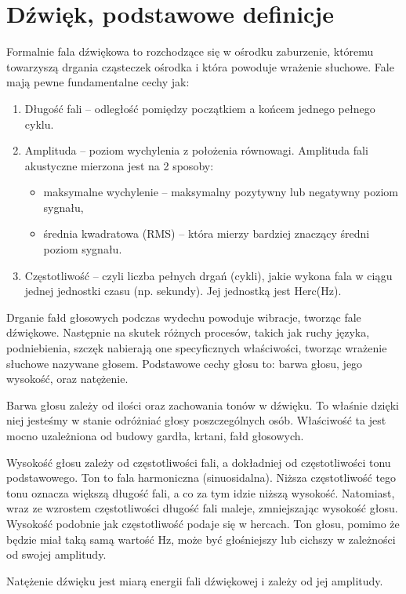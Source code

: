 \documentclass[declaration,shortabstract]{iithesis}
\begin{document}
\section{Dźwięk, podstawowe definicje}
Formalnie fala dźwiękowa to rozchodzące się w ośrodku zaburzenie, któremu towarzyszą drgania cząsteczek ośrodka i która powoduje wrażenie słuchowe. Fale mają pewne fundamentalne cechy jak:
\begin{enumerate}
\item Długość fali -- odległość pomiędzy początkiem a końcem jednego pełnego cyklu.
\item Amplituda -- poziom wychylenia z położenia równowagi. Amplituda fali akustyczne mierzona jest na 2 sposoby:
	\begin{itemize}
	\item maksymalne wychylenie -- maksymalny pozytywny lub negatywny poziom sygnału,
	\item średnia kwadratowa (RMS) -- która mierzy bardziej znaczący średni poziom sygnału.
	\end{itemize}
\item Częstotliwość -- czyli liczba pełnych drgań (cykli), jakie wykona fala w ciągu jednej jednostki czasu (np. sekundy). Jej jednostką jest Herc(Hz).
\end{enumerate}

Drganie fałd głosowych podczas wydechu powoduje wibracje, tworząc fale dźwiękowe. Następnie na skutek różnych procesów, takich jak ruchy języka, podniebienia, szczęk nabierają one specyficznych właściwości, tworząc wrażenie słuchowe nazywane głosem. Podstawowe cechy głosu to: barwa głosu, jego wysokość, oraz natężenie.

Barwa głosu zależy od ilości oraz zachowania tonów w dźwięku. To właśnie dzięki niej jesteśmy w stanie odróżniać głosy poszczególnych osób. Właściwość ta jest mocno uzależniona od budowy gardła, krtani, fałd głosowych. 

Wysokość głosu zależy od częstotliwości fali, a dokładniej od częstotliwości tonu podstawowego. Ton to fala harmoniczna (sinuosidalna). Niższa częstotliwość tego tonu oznacza większą długość fali, a co za tym idzie niższą wysokość. Natomiast, wraz ze wzrostem częstotliwości długość fali maleje, zmniejszając wysokość głosu. Wysokość podobnie jak częstotliwość podaje się w hercach. Ton głosu, pomimo że będzie miał taką samą wartość Hz, może być głośniejszy lub cichszy w zależności od swojej amplitudy. 

Natężenie dźwięku jest miarą energii fali dźwiękowej i zależy od jej amplitudy.
\end{document}
